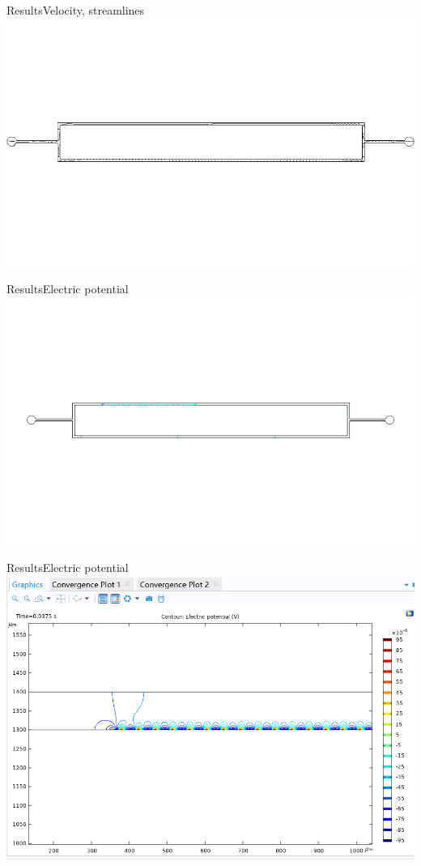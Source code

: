 \documentclass[10pt]{beamer}
\begin{document}
\begin{frame}{Results}{Velocity, streamlines}
    \includegraphics[width=\textwidth]{4.png}
\end{frame}
\begin{frame}{Results}{Electric potential}
    \includegraphics[width=\textwidth]{5.png}
\end{frame}
\begin{frame}{Results}{Electric potential}
    \includegraphics[width=\textwidth]{6.png}
\end{frame}
\end{document}
